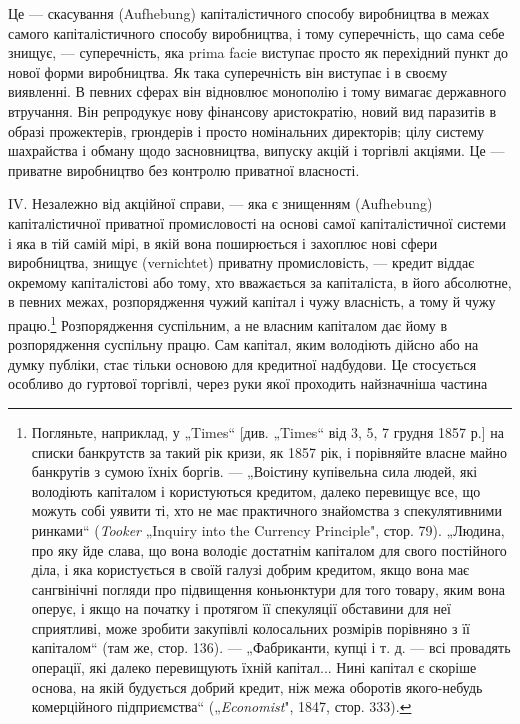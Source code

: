 Це — скасування (Aufhebung) капіталістичного способу виробництва
в межах самого капіталістичного способу виробництва,
і тому суперечність, що сама себе знищує, — суперечність, яка
prima facie виступає просто як перехідний пункт до нової
форми виробництва. Як така суперечність він виступає і в
своєму виявленні. В певних сферах він відновлює монополію і
тому вимагає державного втручання. Він репродукує нову фінансову аристократію, новий вид паразитів в
образі прожектерів,
грюндерів і просто номінальних директорів; цілу систему шахрайства і обману щодо засновництва,
випуску акцій і торгівлі акціями.
Це — приватне виробництво без контролю приватної власності.

IV. Незалежно від акційної справи, — яка є знищенням (Aufhebung) капіталістичної приватної
промисловості на основі самої
капіталістичної системи і яка в тій самій мірі, в якій вона поширюється і захоплює нові сфери
виробництва, знищує (vernichtet)
приватну промисловість, — кредит віддає окремому капіталістові
або тому, хто вважається за капіталіста, в його абсолютне, в
певних межах, розпорядження чужий капітал і чужу власність,
а тому й чужу працю.\footnote{
Погляньте, наприклад, у „Times“ [див. „Times“ від 3, 5, 7 грудня 1857 р.]
на списки банкрутств за такий рік кризи, як 1857 рік, і порівняйте власне майно
банкрутів з сумою їхніх боргів. — „Воістину купівельна сила людей, які володіють
капіталом і користуються кредитом, далеко перевищує все, що можуть собі уявити
ті, хто не має практичного знайомства з спекулятивними ринками“ (\emph{Tooker}
„Inquiry into the Currency Principle", стор. 79). „Людина, про яку йде слава, що
вона володіє достатнім капіталом для свого постійного діла, і яка користується в своїй галузі добрим
кредитом, якщо вона має сангвінічні погляди
про підвищення коньюнктури для того товару, яким вона оперує, і якщо на
початку і протягом її спекуляції обставини для неї сприятливі, може зробити
закупівлі колосальних розмірів порівняно з її капіталом“ (там же, стор. 136). —
 „Фабриканти, купці і т. д. — всі провадять операції, які далеко перевищують їхній
капітал... Нині капітал є скоріше основа, на якій будується добрий кредит,
ніж межа оборотів якого-небудь комерційного підприємства“ („\emph{Economist}", 1847,
стор. 333).
} Розпорядження суспільним, а не власним
капіталом дає йому в розпорядження суспільну працю. Сам капітал, яким володіють дійсно або на думку
публіки, стає тільки
основою для кредитної надбудови. Це стосується особливо до
гуртової торгівлі, через руки якої проходить найзначніша частина
